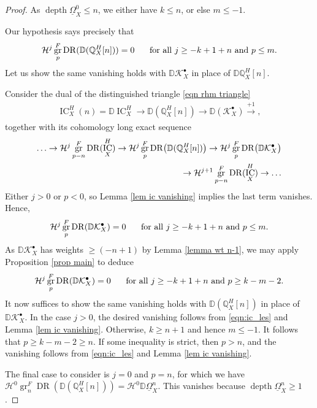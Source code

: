 \documentclass[11pt]{amsart}
\theoremstyle{definition}
\theoremstyle{plain}
\DeclareMathOperator{\gr}{gr}
\DeclareMathOperator{\dr}{DR}
\DeclareMathOperator{\ic}{IC}
\DeclareMathOperator{\depth}{depth}
\begin{document}
\begin{proof}
As $\depth \underline{\Omega}_X^0 \leq n$, we either have $k \leq n$, or else $m \leq -1$. 

Our hypothesis says precisely that
\begin{align*}
    \mathcal{H}^j \gr_p^F \dr( \mathbb{D} (\mathbb{Q}_X^H[n]) ) = 0 \hspace{.5cm} \text{ for all } j \geq -k+1+n \text{ and } p \leq m.
\end{align*}
Let us show the same vanishing holds with $\mathbb{D} \mathcal{K}_X^\bullet$ in place of $\mathbb{D} \mathbb{Q}_X^H[n]$.

Consider the dual of the distinguished triangle \ref{eqn rhm triangle} 
\begin{align*}
    \ic_X^H(n) = \mathbb{D}\ic_X^H \rightarrow \mathbb{D} (\mathbb{Q}_X^H[n]) \rightarrow \mathbb{D} (\mathcal{K}_X^\bullet) \xrightarrow[]{+1},
\end{align*}
together with its cohomology long exact sequence
\begin{align}\label{eqn:ic_les}
\ldots \rightarrow \mathcal{H}^j \gr_{p-n}^F \dr( \ic_X^H )
\rightarrow \mathcal{H}^j \gr_p^F \dr \bigl(\mathbb{D}(\mathbb{Q}_X^H[n])\bigr)
\rightarrow \mathcal{H}^j \gr_p^F \dr\bigl(\mathbb{D}\mathcal{K}_X^\bullet\bigr)
\\
\notag \rightarrow \mathcal{H}^{j+1} \gr_{p-n}^F \dr(\ic_X^H) \rightarrow \ldots
\end{align}
Either $j > 0$ or $p < 0$, so Lemma \ref{lem ic vanishing} implies the last term vanishes. Hence, 
\begin{align*}
    \mathcal{H}^j \gr_p^F \dr( \mathbb{D} \mathcal{K}_X^\bullet ) = 0 \hspace{.5cm} \text{ for all } j \geq -k+1+n \text{ and } p \leq m.
\end{align*}
As $\mathbb{D} \mathcal{K}_X^\bullet$ has weights $\geq (-n+1)$ by Lemma \ref{lemma wt n-1}, we may apply Proposition \ref{prop main} to deduce
\begin{align*}
    \mathcal{H}^j \gr_p^F \dr(\mathbb{D} \mathcal{K}_X^\bullet ) = 0 \hspace{.5cm} \text{ for all } j \geq -k+1+n \text{ and } p \geq k-m-2.
\end{align*}
It now suffices to show the same vanishing holds with $\mathbb{D} (\mathbb{Q}_X^H[n])$ in place of $\mathbb{D} \mathcal{K}_X^\bullet$. In the case $j > 0$, the desired vanishing follows from \ref{eqn:ic_les} and Lemma \ref{lem ic vanishing}. Otherwise, $k \geq n+1$ and hence $m \leq -1$. It follows that $p \geq k-m-2 \geq n$. If some inequality is strict, then $p > n$, and the vanishing follows from \ref{eqn:ic_les} and Lemma \ref{lem ic vanishing}. 

The final case to consider is $j = 0$ and $p = n$, for which we have $\mathcal{H}^0 \gr_{n}^F \dr ( \mathbb{D}(\mathbb{Q}_X^H[n])) = \mathcal{H}^0 \mathbb{D} \underline{\Omega}_X^n$. This vanishes because $\depth \underline{\Omega}_X^n \geq 1$.
\end{proof}
\end{document}
